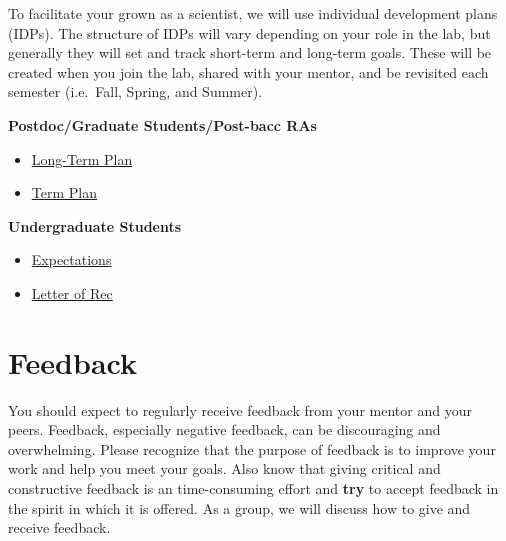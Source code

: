 \documentclass[]{book}
\begin{document}
To facilitate your grown as a scientist, we will use individual development plans (IDPs). The structure of IDPs will vary depending on your role in the lab, but generally they will set and track short-term and long-term goals. These will be created when you join the lab, shared with your mentor, and be revisited each semester (i.e.~Fall, Spring, and Summer).

\textbf{Postdoc/Graduate Students/Post-bacc RAs}

\begin{itemize}
\item
  \href{https://docs.google.com/spreadsheets/d/1bCDeeGkJB_FUFfNlh3WZWZc7nBfc02Cx-rKyZ3bUmZY/edit?usp=sharing}{Long-Term Plan}
\item
  \href{https://docs.google.com/spreadsheets/d/1W-xCC_8to6XuGHu43wUICSiIFMPN1enipK5AzDeoi9k/edit?usp=sharing}{Term Plan}
\end{itemize}

\textbf{Undergraduate Students}

\begin{itemize}
\item
  \href{https://drive.google.com/file/d/1SMBHT4_-o3uOZO_1NsZfPhd7DiCtxzk-/view?usp=sharing}{Expectations}
\item
  \href{https://drive.google.com/file/d/1-fT-UUQl8cwaDV_kTXRV8TXlwEIqiMu2/view?usp=sharing}{Letter of Rec}
\end{itemize}

\hypertarget{feedback}{%
\section{Feedback}\label{feedback}}

You should expect to regularly receive feedback from your mentor and your peers. Feedback, especially negative feedback, can be discouraging and overwhelming. Please recognize that the purpose of feedback is to improve your work and help you meet your goals. Also know that giving critical and constructive feedback is an time-consuming effort and \textbf{try} to accept feedback in the spirit in which it is offered. As a group, we will discuss how to give and receive feedback.
\end{document}
